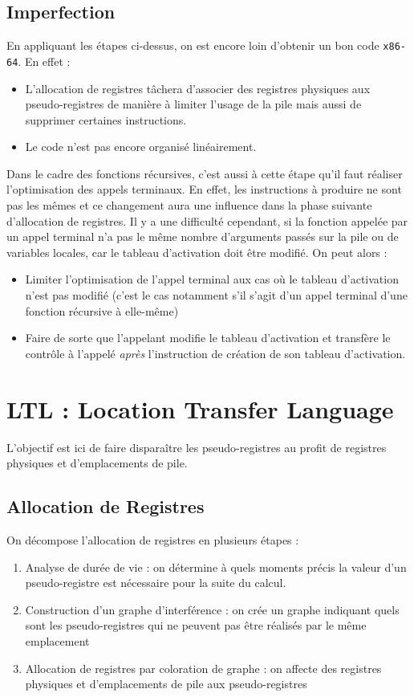 \documentclass{cours}
\begin{document}
\subsection{Imperfection}
En appliquant les étapes ci-dessus, on est encore loin d'obtenir un bon code \texttt{x86-64}. En effet : 
\begin{itemize}
    \item L'allocation de registres tâchera d'associer des registres physiques aux pseudo-registres de manière à limiter l'usage de la pile mais aussi de supprimer certaines instructions. 
    \item Le code n'est pas encore organisé linéairement. 
\end{itemize}
Dans le cadre des fonctions récursives, c'est aussi à cette étape qu'il faut réaliser l'optimisation des appels terminaux. En effet, les instructions à produire ne sont pas les mêmes et ce changement aura une influence dans la phase suivante d'allocation de registres. Il y a une difficulté cependant, si la fonction appelée par un appel terminal n'a pas le même nombre d'arguments passés sur la pile ou de variables locales, car le tableau d'activation doit être modifié. On peut alors :
\begin{itemize}
    \item Limiter l'optimisation de l'appel terminal aux cas où le tableau d'activation n'est pas modifié (c'est le cas notamment s'il s'agit d'un appel terminal d'une fonction récursive à elle-même)
    \item Faire de sorte que l'appelant modifie le tableau d'activation et transfère le contrôle à l'appelé \emph{après} l'instruction de création de son tableau d'activation.
\end{itemize}

\section{LTL : Location Transfer Language}
L'objectif est ici de faire disparaître les pseudo-registres au profit de registres physiques et d'emplacements de pile. 
\subsection{Allocation de Registres}
On décompose l'allocation de registres en plusieurs étapes : 
\begin{enumerate}
    \item Analyse de durée de vie : on détermine à quels moments précis la valeur d'un pseudo-registre est nécessaire pour la suite du calcul. 
    \item Construction d'un graphe d'interférence : on crée un graphe indiquant quels sont les pseudo-registres qui ne peuvent pas être réalisés par le même emplacement
    \item Allocation de registres par coloration de graphe : on affecte des registres physiques et d'emplacements de pile aux pseudo-registres
\end{enumerate}
\end{document}
